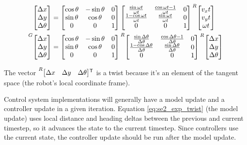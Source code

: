 \begin{align}
{\begin{bmatrix}
    \Delta x \\
    \Delta y \\
    \Delta \theta
  \end{bmatrix}} &=
  \begin{bmatrix}
    \cos\theta & -\sin\theta & 0 \\
    \sin\theta &  \cos\theta & 0 \\
             0 &           0 & 1
  \end{bmatrix}
  \begin{bmatrix}
    \frac{\sin\omega t}{\omega t} & \frac{\cos\omega t - 1}{\omega t} & 0 \\
    \frac{1 - \cos\omega t}{\omega t} & \frac{\sin\omega t}{\omega t} & 0 \\
    0 & 0 & 1
  \end{bmatrix}
  \prescript{R}{}{\begin{bmatrix}
    v_x t \\
    v_y t \\
    \omega t
  \end{bmatrix}} \nonumber \\
  \prescript{G}{}{\begin{bmatrix}
    \Delta x \\
    \Delta y \\
    \Delta \theta
  \end{bmatrix}} &=
  \begin{bmatrix}
    \cos\theta & -\sin\theta & 0 \\
    \sin\theta &  \cos\theta & 0 \\
             0 &           0 & 1
  \end{bmatrix}
  \prescript{R}{}{\begin{bmatrix}
    \frac{\sin\Delta\theta}{\Delta\theta} &
      \frac{\cos\Delta\theta - 1}{\Delta\theta} & 0 \\
    \frac{1 - \cos\Delta\theta}{\Delta\theta} &
      \frac{\sin\Delta\theta}{\Delta\theta} & 0 \\
    0 & 0 & 1
  \end{bmatrix}}
  \prescript{R}{}{\begin{bmatrix}
    \Delta x \\
    \Delta y \\
    \Delta\theta
  \end{bmatrix}}
  \label{eq:se2_exp_twist}
\end{align}

The vector
$\prescript{R}{}{\begin{bmatrix}\Delta x & \Delta y & \Delta\theta \end{bmatrix}}^\mathsf{T}$
is a twist because it's an element of the tangent space (the robot's local
coordinate frame).
\begin{remark}
  Control system implementations will generally have a model update and a
  controller update in a given iteration. Equation \eqref{eq:se2_exp_twist} (the
  model update) uses local distance and heading deltas between the previous and
  current timestep, so it advances the state to the current timestep. Since
  controllers use the current state, the controller update should be run after
  the model update.
\end{remark}

